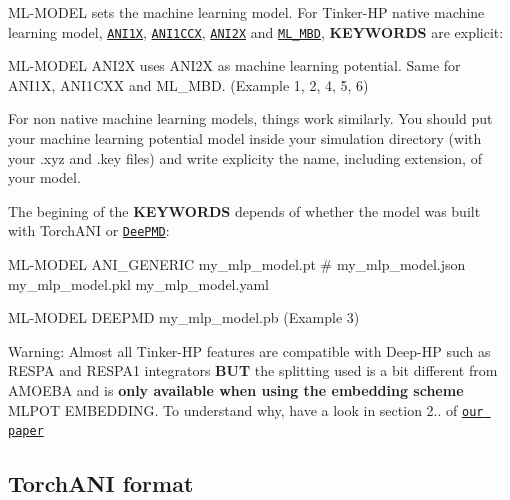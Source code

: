 {\ttfamily M\-L-\/\-M\-O\-D\-E\-L} sets the machine learning model. For Tinker-\/\-H\-P native machine learning model, \href{https://pubs.rsc.org/en/content/articlehtml/2017/sc/c6sc05720a}{\tt A\-N\-I1\-X}, \href{https://www.nature.com/articles/s41467-019-10827-4}{\tt A\-N\-I1\-C\-C\-X}, \href{https://pubs.acs.org/doi/full/10.1021/acs.jctc.0c00121}{\tt A\-N\-I2\-X} and \href{https://pubs.acs.org/doi/full/10.1021/acs.jpclett.2c00936}{\tt M\-L\-\_\-\-M\-B\-D}, {\bfseries K\-E\-Y\-W\-O\-R\-D\-S} are explicit\-:
\begin{DoxyItemize}
\item {\ttfamily M\-L-\/\-M\-O\-D\-E\-L A\-N\-I2\-X} uses A\-N\-I2\-X as machine learning potential. Same for A\-N\-I1\-X, A\-N\-I1\-C\-X\-X and M\-L\-\_\-\-M\-B\-D. (Example 1, 2, 4, 5, 6)
\end{DoxyItemize}

For non native machine learning models, things work similarly. You should put your machine learning potential model inside your simulation directory (with your .xyz and .key files) and write explicity the name, including extension, of your model. \par
 The begining of the {\bfseries K\-E\-Y\-W\-O\-R\-D\-S} depends of whether the model was built with Torch\-A\-N\-I or \href{https://docs.deepmodeling.com/projects/deepmd/en/master/index.html}{\tt Dee\-P\-M\-D}\-:
\begin{DoxyItemize}
\item {\ttfamily M\-L-\/\-M\-O\-D\-E\-L A\-N\-I\-\_\-\-G\-E\-N\-E\-R\-I\-C my\-\_\-mlp\-\_\-model.\-pt \# my\-\_\-mlp\-\_\-model.\-json my\-\_\-mlp\-\_\-model.\-pkl my\-\_\-mlp\-\_\-model.\-yaml}
\item {\ttfamily M\-L-\/\-M\-O\-D\-E\-L D\-E\-E\-P\-M\-D my\-\_\-mlp\-\_\-model.\-pb} (Example 3)
\end{DoxyItemize}

Warning\-: Almost all Tinker-\/\-H\-P features are compatible with Deep-\/\-H\-P such as R\-E\-S\-P\-A and R\-E\-S\-P\-A1 integrators {\bfseries B\-U\-T} the splitting used is a bit different from A\-M\-O\-E\-B\-A and is {\bfseries only available when using the embedding scheme} {\ttfamily M\-L\-P\-O\-T E\-M\-B\-E\-D\-D\-I\-N\-G}. To understand why, have a look in section 2.. of \href{https://arxiv.org/pdf/2207.14276.pdf}{\tt our paper}

\subsection*{Torch\-A\-N\-I format}

